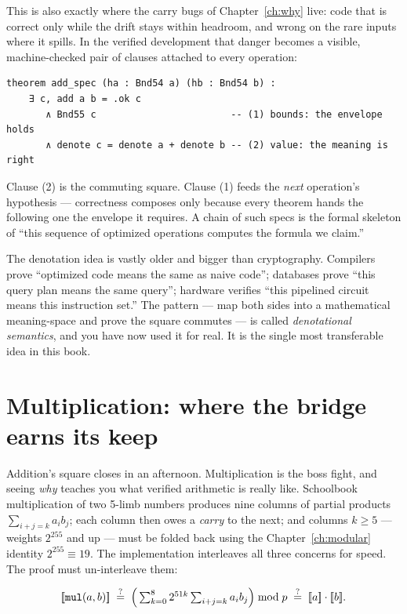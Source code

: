 This is also exactly where the carry bugs of Chapter~\ref{ch:why} live: code
that is correct only while the drift stays within headroom, and wrong on the
rare inputs where it spills. In the verified development that danger becomes
a visible, machine-checked pair of clauses attached to every operation:

\begin{lstlisting}[language=Lean]
theorem add_spec (ha : Bnd54 a) (hb : Bnd54 b) :
    ∃ c, add a b = .ok c
       ∧ Bnd55 c                        -- (1) bounds: the envelope holds
       ∧ denote c = denote a + denote b -- (2) value: the meaning is right
\end{lstlisting}

Clause (2) is the commuting square. Clause (1) feeds the \emph{next}
operation's hypothesis --- correctness composes only because every theorem
hands the following one the envelope it requires. A chain of such specs is
the formal skeleton of ``this sequence of optimized operations computes the
formula we claim.''

\begin{aha}
The denotation idea is vastly older and bigger than cryptography. Compilers
prove ``optimized code means the same as naive code''; databases prove
``this query plan means the same query''; hardware verifies ``this pipelined
circuit means this instruction set.'' The pattern --- map both sides into a
mathematical meaning-space and prove the square commutes --- is called
\emph{denotational semantics}, and you have now used it for real. It is the
single most transferable idea in this book.
\end{aha}

\section{Multiplication: where the bridge earns its keep}

Addition's square closes in an afternoon. Multiplication is the boss fight,
and seeing \emph{why} teaches you what verified arithmetic is really like.
Schoolbook multiplication of two 5-limb numbers produces nine columns of
partial products $\sum_{i+j=k} a_i b_j$; each column then owes a
\emph{carry} to the next; and columns $k \ge 5$ --- weights $2^{255}$ and up
--- must be folded back using the Chapter~\ref{ch:modular} identity
$2^{255} \equiv 19$. The implementation interleaves all three concerns for
speed. The proof must un-interleave them:

\[
[\mkern-3.3mu[ \mathtt{mul}(a,b) ]\mkern-3.3mu]
\;\overset{?}{=}\;
\Big(\textstyle\sum_{k=0}^{8} 2^{51k} \sum_{i+j=k} a_i b_j \Big) \bmod p
\;\overset{?}{=}\; [\mkern-3.3mu[ a ]\mkern-3.3mu] \cdot [\mkern-3.3mu[ b ]\mkern-3.3mu] .
\]


